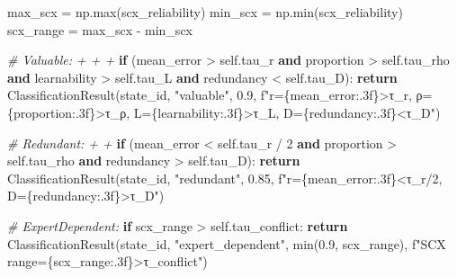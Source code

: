 \documentclass[
  12pt,
]{article}
\newenvironment{Shaded}{}{}
\newcommand{\BuiltInTok}[1]{\textcolor[rgb]{0.00,0.50,0.00}{#1}}
\newcommand{\CommentTok}[1]{\textcolor[rgb]{0.38,0.63,0.69}{\textit{#1}}}
\newcommand{\ControlFlowTok}[1]{\textcolor[rgb]{0.00,0.44,0.13}{\textbf{#1}}}
\newcommand{\DecValTok}[1]{\textcolor[rgb]{0.25,0.63,0.44}{#1}}
\newcommand{\FloatTok}[1]{\textcolor[rgb]{0.25,0.63,0.44}{#1}}
\newcommand{\KeywordTok}[1]{\textcolor[rgb]{0.00,0.44,0.13}{\textbf{#1}}}
\newcommand{\NormalTok}[1]{#1}
\newcommand{\OperatorTok}[1]{\textcolor[rgb]{0.40,0.40,0.40}{#1}}
\newcommand{\SpecialCharTok}[1]{\textcolor[rgb]{0.25,0.44,0.63}{#1}}
\newcommand{\SpecialStringTok}[1]{\textcolor[rgb]{0.73,0.40,0.53}{#1}}
\newcommand{\StringTok}[1]{\textcolor[rgb]{0.25,0.44,0.63}{#1}}
\newcommand{\VariableTok}[1]{\textcolor[rgb]{0.10,0.09,0.49}{#1}}
\begin{document}
\begin{Shaded}
\begin{Highlighting}[]
\NormalTok{        max\_scx }\OperatorTok{=}\NormalTok{ np.}\BuiltInTok{max}\NormalTok{(scx\_reliability)}
\NormalTok{        min\_scx }\OperatorTok{=}\NormalTok{ np.}\BuiltInTok{min}\NormalTok{(scx\_reliability)}
\NormalTok{        scx\_range }\OperatorTok{=}\NormalTok{ max\_scx }\OperatorTok{{-}}\NormalTok{ min\_scx}

        \CommentTok{\# Valuable:  +  +  + }
        \ControlFlowTok{if}\NormalTok{ (mean\_error }\OperatorTok{\textgreater{}} \VariableTok{self}\NormalTok{.tau\_r }\KeywordTok{and}\NormalTok{ proportion }\OperatorTok{\textgreater{}} \VariableTok{self}\NormalTok{.tau\_rho}
                \KeywordTok{and}\NormalTok{ learnability }\OperatorTok{\textgreater{}} \VariableTok{self}\NormalTok{.tau\_L }\KeywordTok{and}\NormalTok{ redundancy }\OperatorTok{\textless{}} \VariableTok{self}\NormalTok{.tau\_D):}
            \ControlFlowTok{return}\NormalTok{ ClassificationResult(state\_id, }\StringTok{"valuable"}\NormalTok{, }\FloatTok{0.9}\NormalTok{,}
                \SpecialStringTok{f"r=}\SpecialCharTok{\{}\NormalTok{mean\_error}\SpecialCharTok{:.3f\}}\SpecialStringTok{\textgreater{}τ\_r, ρ=}\SpecialCharTok{\{}\NormalTok{proportion}\SpecialCharTok{:.3f\}}\SpecialStringTok{\textgreater{}τ\_ρ, L=}\SpecialCharTok{\{}\NormalTok{learnability}\SpecialCharTok{:.3f\}}\SpecialStringTok{\textgreater{}τ\_L, D=}\SpecialCharTok{\{}\NormalTok{redundancy}\SpecialCharTok{:.3f\}}\SpecialStringTok{\textless{}τ\_D"}\NormalTok{)}

        \CommentTok{\# Redundant:  +  + }
        \ControlFlowTok{if}\NormalTok{ (mean\_error }\OperatorTok{\textless{}} \VariableTok{self}\NormalTok{.tau\_r }\OperatorTok{/} \DecValTok{2} \KeywordTok{and}\NormalTok{ proportion }\OperatorTok{\textgreater{}} \VariableTok{self}\NormalTok{.tau\_rho}
                \KeywordTok{and}\NormalTok{ redundancy }\OperatorTok{\textgreater{}} \VariableTok{self}\NormalTok{.tau\_D):}
            \ControlFlowTok{return}\NormalTok{ ClassificationResult(state\_id, }\StringTok{"redundant"}\NormalTok{, }\FloatTok{0.85}\NormalTok{,}
                \SpecialStringTok{f"r=}\SpecialCharTok{\{}\NormalTok{mean\_error}\SpecialCharTok{:.3f\}}\SpecialStringTok{\textless{}τ\_r/2, D=}\SpecialCharTok{\{}\NormalTok{redundancy}\SpecialCharTok{:.3f\}}\SpecialStringTok{\textgreater{}τ\_D"}\NormalTok{)}

        \CommentTok{\# ExpertDependent: }
        \ControlFlowTok{if}\NormalTok{ scx\_range }\OperatorTok{\textgreater{}} \VariableTok{self}\NormalTok{.tau\_conflict:}
            \ControlFlowTok{return}\NormalTok{ ClassificationResult(state\_id, }\StringTok{"expert\_dependent"}\NormalTok{, }\BuiltInTok{min}\NormalTok{(}\FloatTok{0.9}\NormalTok{, scx\_range),}
                \SpecialStringTok{f"SCX range=}\SpecialCharTok{\{}\NormalTok{scx\_range}\SpecialCharTok{:.3f\}}\SpecialStringTok{\textgreater{}τ\_conflict"}\NormalTok{)}


\end{Highlighting}
\end{Shaded}
\end{document}
